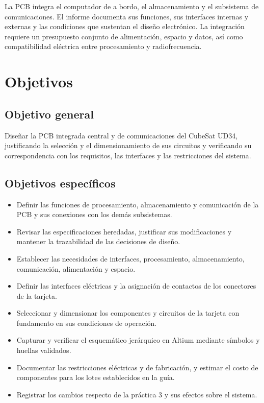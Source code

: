 \documentclass[11pt,letterpaper]{article}
\begin{document}
La PCB integra el computador de a bordo, el almacenamiento y el subsistema de comunicaciones. El informe documenta sus funciones, sus interfaces internas y externas y las condiciones que sustentan el diseño electrónico. La integración requiere un presupuesto conjunto de alimentación, espacio y datos, así como compatibilidad eléctrica entre procesamiento y radiofrecuencia.

\section{Objetivos}
\subsection{Objetivo general}
Diseñar la PCB integrada central y de comunicaciones del CubeSat UD34, justificando la selección y el dimensionamiento de sus circuitos y verificando su correspondencia con los requisitos, las interfaces y las restricciones del sistema.
\subsection{Objetivos específicos}
\begin{itemize}
\item Definir las funciones de procesamiento, almacenamiento y comunicación de la PCB y sus conexiones con los demás subsistemas.
\item Revisar las especificaciones heredadas, justificar sus modificaciones y mantener la trazabilidad de las decisiones de diseño.
\item Establecer las necesidades de interfaces, procesamiento, almacenamiento, comunicación, alimentación y espacio.
\item Definir las interfaces eléctricas y la asignación de contactos de los conectores de la tarjeta.
\item Seleccionar y dimensionar los componentes y circuitos de la tarjeta con fundamento en sus condiciones de operación.
\item Capturar y verificar el esquemático jerárquico en Altium mediante símbolos y huellas validados.
\item Documentar las restricciones eléctricas y de fabricación, y estimar el costo de componentes para los lotes establecidos en la guía.
\item Registrar los cambios respecto de la práctica 3 y sus efectos sobre el sistema.
\end{itemize}
\end{document}
